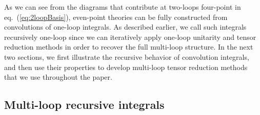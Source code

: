 \documentclass[11pt,letter]{article}
\def\eqn#1{eq.~(\ref{#1})}
\begin{document}
As we can see from the diagrams that contribute at two-loops four-point in \eqn{eq:2loopBasis}, even-point theories can be fully constructed from convolutions of one-loop integrals. As described earlier, we call such integrals {recursively one-loop} since we can iteratively apply one-loop unitarity and tensor reduction methods in order to recover the full multi-loop structure. In the next two sections, we first illustrate the recursive behavior of convolution integrals, and then use their properties to develop multi-loop tensor reduction methods that we use throughout the paper. 

\subsection{Multi-loop recursive integrals}
\label{sec:recInt}
\end{document}
